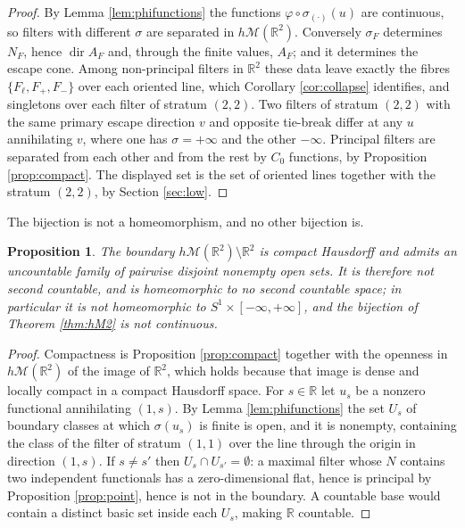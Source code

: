 \documentclass[11pt]{amsart}
\theoremstyle{plain}
\newtheorem{proposition}[theorem]{Proposition}
\theoremstyle{definition}
\DeclareMathOperator{\dir}{dir}
\newcommand{\RR}{\mathbb{R}}
\begin{document}
\begin{proof}
By Lemma \ref{lem:phifunctions} the functions $\varphi\circ\sigma_{(\cdot)}(u)$ are continuous, so filters with different $\sigma$ are separated in $h\mathcal{M}(\RR^2)$. Conversely $\sigma_F$ determines $N_F$, hence $\dir A_F$ and, through the finite values, $A_F$; and it determines the escape cone. Among non-principal filters in $\RR^2$ these data leave exactly the fibres $\{F_\ell,F_{+},F_{-}\}$ over each oriented line, which Corollary \ref{cor:collapse} identifies, and singletons over each filter of stratum $(2,2)$. Two filters of stratum $(2,2)$ with the same primary escape direction $v$ and opposite tie-break differ at any $u$ annihilating $v$, where one has $\sigma=+\infty$ and the other $-\infty$. Principal filters are separated from each other and from the rest by $C_0$ functions, by Proposition \ref{prop:compact}. The displayed set is the set of oriented lines together with the stratum $(2,2)$, by Section \ref{sec:low}.
\end{proof}

The bijection is not a homeomorphism, and no other bijection is.

\begin{proposition}\label{prop:notcylinder}
The boundary $h\mathcal{M}(\RR^2)\setminus\RR^2$ is compact Hausdorff and admits an uncountable family of pairwise disjoint nonempty open sets. It is therefore not second countable, and is homeomorphic to no second countable space; in particular it is not homeomorphic to $S^1\times[-\infty,+\infty]$, and the bijection of Theorem \ref{thm:hM2} is not continuous.
\end{proposition}

\begin{proof}
Compactness is Proposition \ref{prop:compact} together with the openness in $h\mathcal{M}(\RR^2)$ of the image of $\RR^2$, which holds because that image is dense and locally compact in a compact Hausdorff space. For $s\in\RR$ let $u_s$ be a nonzero functional annihilating $(1,s)$. By Lemma \ref{lem:phifunctions} the set $U_s$ of boundary classes at which $\sigma(u_s)$ is finite is open, and it is nonempty, containing the class of the filter of stratum $(1,1)$ over the line through the origin in direction $(1,s)$. If $s\neq s'$ then $U_s\cap U_{s'}=\emptyset$: a maximal filter whose $N$ contains two independent functionals has a zero-dimensional flat, hence is principal by Proposition \ref{prop:point}, hence is not in the boundary. A countable base would contain a distinct basic set inside each $U_s$, making $\RR$ countable.
\end{proof}
\end{document}
